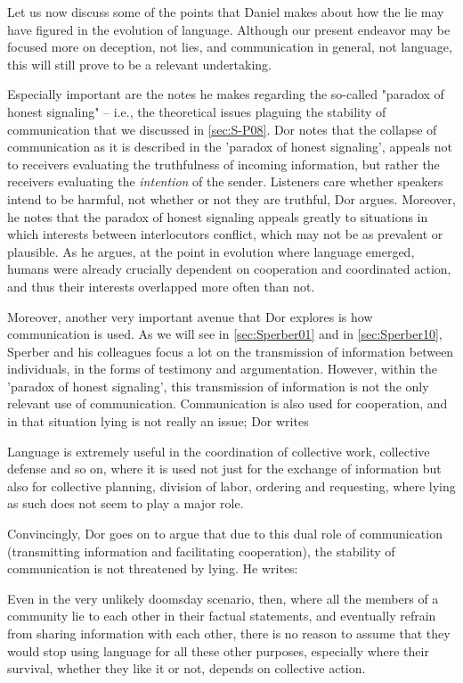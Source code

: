 Let us now discuss some of the points that Daniel \citet{Dor17} makes about how the lie may have figured in the evolution of language. Although our present endeavor may be focused more on deception, not lies, and communication in general, not language, this will still prove to be a relevant undertaking.

Especially important are the notes he makes regarding the so-called "paradox of honest signaling" \citep[p.~45]{Dor17} -- i.e., the theoretical issues plaguing the stability of communication that we discussed in \cref{sec:S-P08}. Dor notes that the collapse of communication as it is described in the 'paradox of honest signaling', appeals not to receivers evaluating the truthfulness of incoming information, but rather the receivers evaluating the \emph{intention} of the sender. Listeners care whether speakers intend to be harmful, not whether or not they are truthful, Dor argues.
Moreover, he notes that the paradox of honest signaling appeals greatly to situations in which interests between interlocutors conflict, which may not be as prevalent or plausible. As he argues, at the point in evolution where language emerged, humans were already crucially dependent on cooperation and coordinated action, and thus their interests overlapped more often than not.

Moreover, another very important avenue that Dor explores is how communication is used. As we will see in \cref{sec:Sperber01} and in \cref{sec:Sperber10}, Sperber and his colleagues focus a lot on the transmission of information between individuals, in the forms of testimony and argumentation. However, within the 'paradox of honest signaling', this transmission of information is not the only relevant use of communication. Communication is also used for cooperation, and in that situation lying is not really an issue; Dor writes
\begin{quoting}
    Language is extremely useful in the coordination of collective work, collective defense and so on, where it is used not just for the exchange of information but also for collective planning, division of labor, ordering and requesting, where lying as such does not seem to play a major role.
    \hfill \citep[p.~51]{Dor17}
\end{quoting}
Convincingly, Dor goes on to argue that due to this dual role of communication (transmitting information and facilitating cooperation), the stability of communication is not threatened by lying. He writes:
\begin{quoting}
    Even in the very unlikely doomsday scenario, then, where all the members of a community lie to each other in their factual statements, and eventually refrain from sharing information with each other, there is no reason to assume that they would stop using language for all these other purposes, especially where their survival, whether they like it or not, depends on collective action.
    \hfill \citep[p.~52]{Dor17}
\end{quoting}

